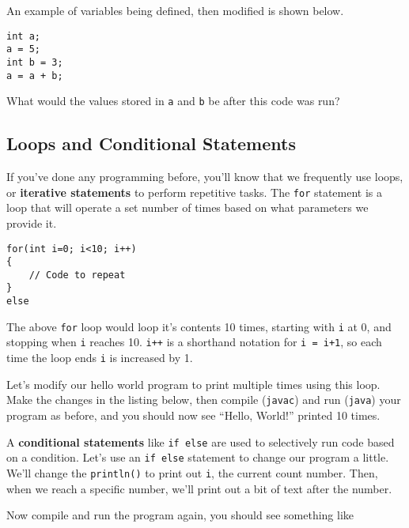 	An example of variables being defined, then modified is shown below.
	
	\begin{lstlisting}[style=Java, numbers=none]
int a;
a = 5;
int b = 3;
a = a + b;
	\end{lstlisting}
	
	What would the values stored in \texttt{a} and \texttt{b} be after this code was run?	
	
	\subsection{Loops and Conditional Statements}
	
		If you've done any programming before, you'll know that we frequently use loops, or \textbf{iterative statements} to perform repetitive tasks. The \texttt{for} statement is a loop that will operate a set number of times based on what parameters we provide it.
		
		\begin{lstlisting}[style=Java, firstnumber=5]
for(int i=0; i<10; i++)
{
	// Code to repeat
}
else
		\end{lstlisting}
	
		The above \texttt{for} loop would loop it's contents 10 times, starting with \texttt{i} at 0, and stopping when \texttt{i} reaches 10. \texttt{i++} is a shorthand notation for \texttt{i = i+1}, so each time the loop ends \texttt{i} is increased by 1.
		
		Let's modify our hello world program to print multiple times using this loop. Make the changes in the listing below, then compile (\texttt{javac}) and run (\texttt{java}) your program as before, and you should now see ``Hello, World!'' printed 10 times.
		
		
		
		A \textbf{conditional statements} like \texttt{if else} are used to selectively run code based on a condition. Let's use an \texttt{if else} statement to change our program a little. We'll change the \texttt{println()} to print out \texttt{i}, the current count number. Then, when we reach a specific number, we'll print out a bit of text after the number.
		
		
		
		Now compile and run the program again, you should see something like
		
